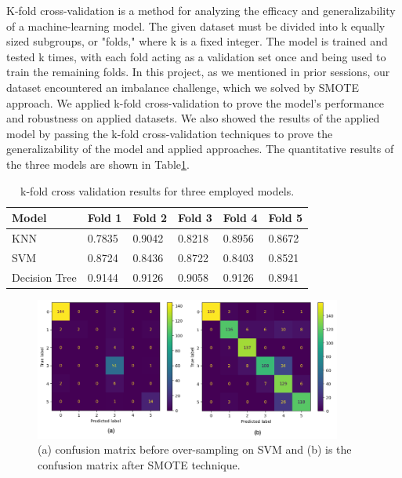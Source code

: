 \documentclass{article}
\begin{document}
K-fold cross-validation is a method for analyzing the efficacy and generalizability of a machine-learning model. The given dataset must be divided into k equally sized subgroups, or "folds," where k is a fixed integer. The model is trained and tested k times, with each fold acting as a validation set once and being used to train the remaining folds. In this project, as we mentioned in prior sessions, our dataset encountered an imbalance challenge, which we solved by SMOTE approach. We applied k-fold cross-validation to prove the model's performance and robustness on applied datasets. We also showed the results of the applied model by passing the k-fold cross-validation techniques to prove the generalizability of the model and applied approaches. The quantitative results of the three models are shown in Table\ref{k-fold1}.




\begin{table}[]
\caption{k-fold cross validation results for three employed models.}
\label{k-fold1}
\begin{center}
\begin{tabular}{|l|l|l|l|l|l|}

\hline
Model & Fold 1  &  Fold 2& Fold 3 & Fold 4 & Fold 5 \\ \hline
KNN & 0.7835  &  0.9042& 0.8218 & 0.8956 &  0.8672\\ \hline
SVM & 0.8724 &0.8436  &0.8722  & 0.8403 & 0.8521 \\ \hline
Decision Tree & 0.9144 & 0.9126 & 0.9058 & 0.9126 & 0.8941 \\ \hline

\end{tabular}
\end{center}
\end{table}



\begin{figure}[h]\label{svm-conf}
\centering
\includegraphics[width=0.9\textwidth]{SVM_confusion.png}
\caption{(a) confusion matrix before over-sampling on SVM and (b) is the confusion matrix after SMOTE technique.}\label{conf1}
\end{figure}
\end{document}
